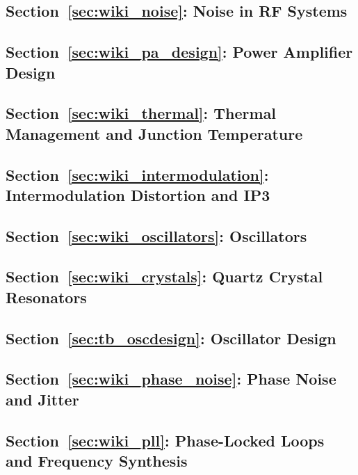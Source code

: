 
\subsection*{Section~\ref{sec:wiki_noise}: Noise in RF Systems}

\subsection*{Section~\ref{sec:wiki_pa_design}: Power Amplifier Design}

\subsection*{Section~\ref{sec:wiki_thermal}: Thermal Management and Junction Temperature}

\subsection*{Section~\ref{sec:wiki_intermodulation}: Intermodulation Distortion and IP3}

\subsection*{Section~\ref{sec:wiki_oscillators}: Oscillators}

\subsection*{Section~\ref{sec:wiki_crystals}: Quartz Crystal Resonators}

\subsection*{Section~\ref{sec:tb_oscdesign}: Oscillator Design}

\subsection*{Section~\ref{sec:wiki_phase_noise}: Phase Noise and Jitter}

\subsection*{Section~\ref{sec:wiki_pll}: Phase-Locked Loops and Frequency Synthesis}
